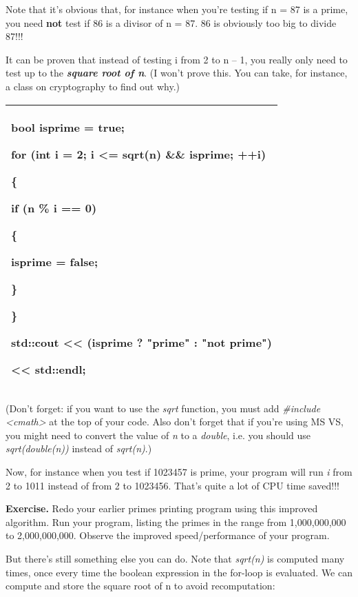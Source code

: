 \documentclass[
]{article}
\begin{document}
Note that it's obvious that, for instance when you're testing if n = 87
is a prime, you need \textbf{not} test if 86 is a divisor of n = 87. 86
is obviously too big to divide 87!!!

It can be proven that instead of testing i from 2 to n -- 1, you really
only need to test up to the \emph{\textbf{square root of n}}. (I won't
prove this. You can take, for instance, a class on cryptography to find
out why.)

\begin{longtable}[]{@{}l@{}}
\toprule
\endhead
\begin{minipage}[t]{0.97\columnwidth}\raggedright
bool isprime = true;

for (int i = 2; i \textbf{\textless= sqrt(n)} \&\& isprime; ++i)

\{

if (n \% i == 0)

\{

isprime = false;

\}

\}

std::cout \textless\textless{} (isprime ? "prime" : "not prime")

\textless\textless{} std::endl;\strut
\end{minipage}\tabularnewline
\bottomrule
\end{longtable}

(Don't forget: if you want to use the \emph{sqrt} function, you must add
\emph{\#include \textless cmath\textgreater{}} at the top of your code.
Also don't forget that if you're using MS VS, you might need to convert
the value of \emph{n} to a \emph{double}, i.e. you should use
\emph{sqrt(double(n))} instead of \emph{sqrt(n)}.)

Now, for instance when you test if 1023457 is prime, your program will
run \emph{i} from 2 to 1011 instead of from 2 to 1023456. That's quite a
lot of CPU time saved!!!

\textbf{Exercise.} Redo your earlier primes printing program using this
improved algorithm. Run your program, listing the primes in the range
from 1,000,000,000 to 2,000,000,000. Observe the improved
speed/performance of your program.

But there's still something else you can do. Note that \emph{sqrt(n)} is
computed many times, once every time the boolean expression in the
for-loop is evaluated. We can compute and store the square root of n to
avoid recomputation:
\end{document}
